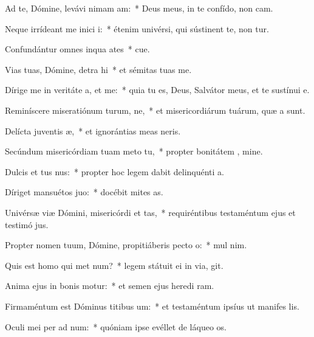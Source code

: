 \item Ad te, Dómine, levávi nimam am:~* Deus meus, in te confído, non cam.
\item Neque irrídeant me inici i:~* étenim univérsi, qui sústinent te, non tur.
\item Confundántur omnes inqua ates~* cue.
\item Vias tuas, Dómine, detra hi~* et sémitas tuas  me.
\item Dírige me in veritáte a, et  me:~* quia tu es, Deus, Salvátor meus, et te sustínui  e.
\item Reminíscere miseratiónum turum, ne,~* et misericordiárum tuárum, quæ a  sunt.
\item Delícta juventis æ,~* et ignorántias meas  neris.
\item Secúndum misericórdiam tuam meto  tu,~* propter bonitátem , mine.
\item Dulcis et tus nus:~* propter hoc legem dabit delinquénti  a.
\item Díriget mansuétos  juo:~* docébit mites  as.
\item Univérsæ viæ Dómini, misericórdi et tas,~* requiréntibus testaméntum ejus et testimó jus.
\item Propter nomen tuum, Dómine, propitiáberis pecto o:~* mul  nim.
\item Quis est homo qui met num?~* legem státuit ei in via,  git.
\item Anima ejus in bonis motur:~* et semen ejus heredi ram.
\item Firmaméntum est Dóminus titibus um:~* et testaméntum ipsíus ut manifes lis.
\item Oculi mei per ad num:~* quóniam ipse evéllet de láqueo  os.
